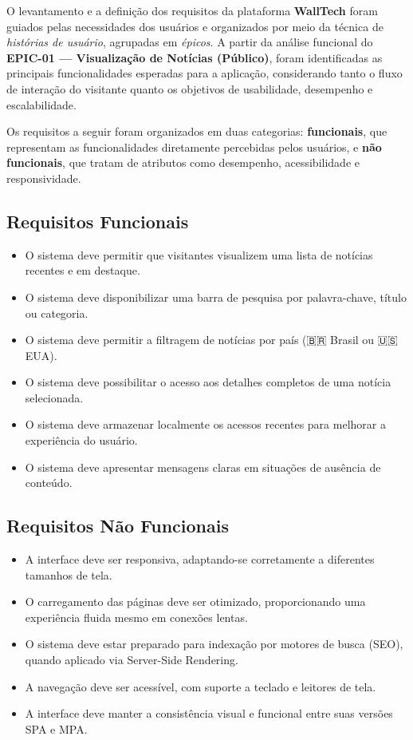 O levantamento e a definição dos requisitos da plataforma \textbf{WallTech} foram guiados pelas necessidades dos usuários e organizados por meio da técnica de \textit{histórias de usuário}, agrupadas em \textit{épicos}. A partir da análise funcional do \textbf{EPIC-01 — Visualização de Notícias (Público)}, foram identificadas as principais funcionalidades esperadas para a aplicação, considerando tanto o fluxo de interação do visitante quanto os objetivos de usabilidade, desempenho e escalabilidade.

Os requisitos a seguir foram organizados em duas categorias: \textbf{funcionais}, que representam as funcionalidades diretamente percebidas pelos usuários, e \textbf{não funcionais}, que tratam de atributos como desempenho, acessibilidade e responsividade.

\subsection{Requisitos Funcionais}
\label{subsec:requisitos-funcionais}

\begin{itemize}
  \item O sistema deve permitir que visitantes visualizem uma lista de notícias recentes e em destaque.
  \item O sistema deve disponibilizar uma barra de pesquisa por palavra-chave, título ou categoria.
  \item O sistema deve permitir a filtragem de notícias por país (🇧🇷 Brasil ou 🇺🇸 EUA).
  \item O sistema deve possibilitar o acesso aos detalhes completos de uma notícia selecionada.
  \item O sistema deve armazenar localmente os acessos recentes para melhorar a experiência do usuário.
  \item O sistema deve apresentar mensagens claras em situações de ausência de conteúdo.
\end{itemize}

\subsection{Requisitos Não Funcionais}
\label{subsec:requisitos-nao-funcionais}

\begin{itemize}
  \item A interface deve ser responsiva, adaptando-se corretamente a diferentes tamanhos de tela.
  \item O carregamento das páginas deve ser otimizado, proporcionando uma experiência fluida mesmo em conexões lentas.
  \item O sistema deve estar preparado para indexação por motores de busca (SEO), quando aplicado via Server-Side Rendering.
  \item A navegação deve ser acessível, com suporte a teclado e leitores de tela.
  \item A interface deve manter a consistência visual e funcional entre suas versões SPA e MPA.
\end{itemize}


